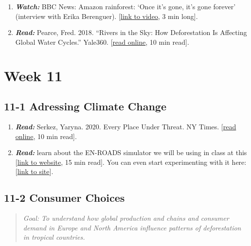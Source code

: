 \documentclass[
  10pt,
  letterpaper,
  oneside,
  open=any]{scrbook}
\begin{document}
\begin{enumerate}
\def\labelenumi{\arabic{enumi}.}
\item
  \textbf{\emph{Watch:}} BBC News: Amazon rainforest: `Once it's gone,
  it's gone forever' (interview with Erika Berenguer).
  {[}\href{https://www.youtube.com/watch?v=TigV80hwebg}{link to video},
  3 min long{]}.
\item
  \textbf{\emph{Read:}} Pearce, Fred. 2018. ``Rivers in the Sky: How
  Deforestation Is Affecting Global Water Cycles.'' Yale360.
  {[}\href{https://e360.yale.edu/features/how-deforestation-affecting-global-water-cycles-climate-change}{read
  online}, 10 min read{]}.
\end{enumerate}

\section{Week 11}\label{week-11}

\subsection*{11-1 Adressing Climate
Change}\label{adressing-climate-change}

\begin{enumerate}
\def\labelenumi{\arabic{enumi}.}
\item
  \textbf{\emph{Read:}} Serkez, Yaryna. 2020. Every Place Under Threat.
  NY Times.
  {[}\href{https://www.nytimes.com/interactive/2020/10/02/opinion/amazon-under-threat.html}{read
  online}, 10 min read{]}.
\item
  \textbf{\emph{Read:}} learn about the EN-ROADS simulator we will be
  using in class at this
  {[}\href{https://www.climateinteractive.org/en-roads/}{link to
  website}, 15 min read{]}. You can even start experimenting with it
  here:
  {[}\href{https://en-roads.climateinteractive.org/scenario.html?v=22.8.0}{link
  to site}{]}.
\end{enumerate}

\subsection*{11-2 Consumer Choices}\label{consumer-choices}

\begin{quote}
\emph{Goal: To understand how global production and chains and consumer
demand in Europe and North America influence patterns of deforestation
in tropical countries.}
\end{quote}
\end{document}
